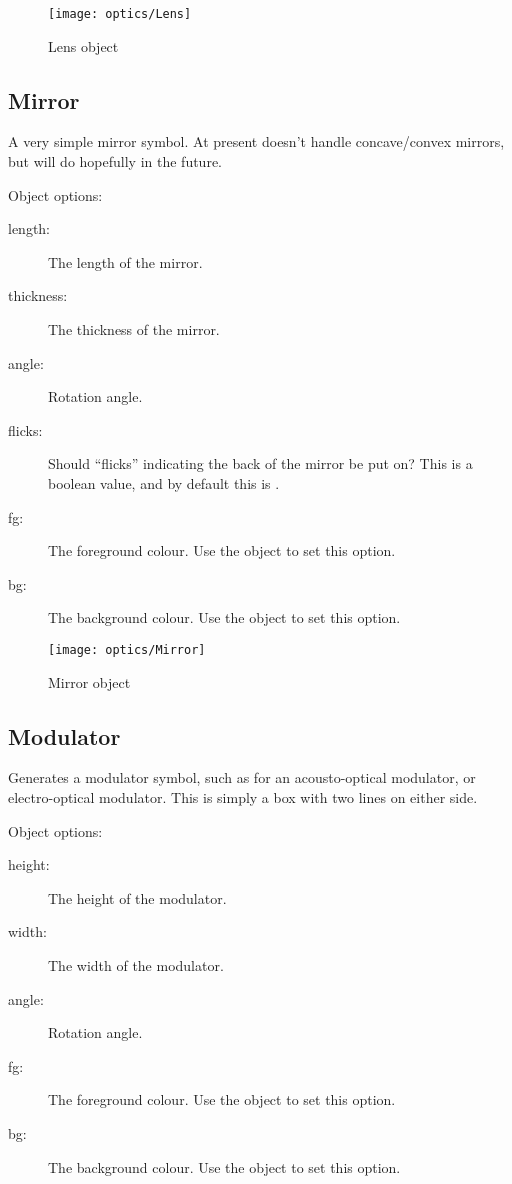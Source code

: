 \begin{figure}[!ht]
\centerline{\texttt{[image: optics/Lens]}}
\caption{Lens object}
\label{fig:lens}
\end{figure}

\subsection{Mirror}

A very simple mirror symbol.  At present doesn't handle concave/convex
mirrors, but will do hopefully in the future.

Object options:
\begin{description}
\item[length:] The length of the mirror.
\item[thickness:] The thickness of the mirror.
\item[angle:] Rotation angle.
\item[flicks:] Should ``flicks'' indicating the back of the mirror be put
on?  This is a boolean value, and by default this is .
\item[fg:] The foreground colour.  Use the  object to set this
option.
\item[bg:] The background colour.  Use the  object to set this
option.
\end{description}

\begin{figure}[!ht]
\centerline{\texttt{[image: optics/Mirror]}}
\caption{Mirror object}
\label{fig:mirror}
\end{figure}

\subsection{Modulator}

Generates a modulator symbol, such as for an acousto-optical modulator, or
electro-optical modulator.  This is simply a box with two lines on either
side.

Object options:
\begin{description}
\item[height:] The height of the modulator.
\item[width:] The width of the modulator.
\item[angle:] Rotation angle.
\item[fg:] The foreground colour.  Use the  object to set this
option.
\item[bg:] The background colour.  Use the  object to set this
option.
\end{description}

